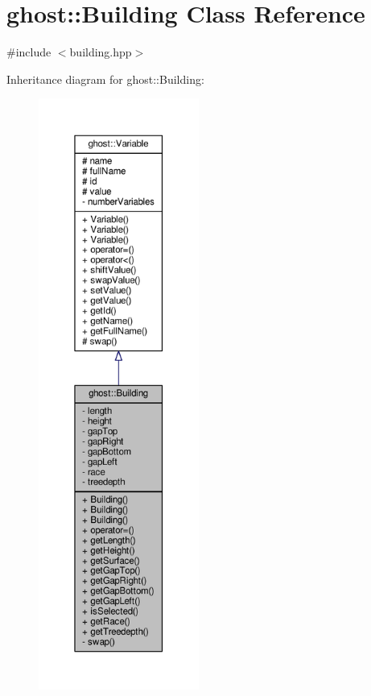 \hypertarget{classghost_1_1Building}{\section{ghost\-:\-:Building Class Reference}
\label{classghost_1_1Building}
}


{\ttfamily \#include $<$building.\-hpp$>$}



Inheritance diagram for ghost\-:\-:Building\-:\nopagebreak
\begin{figure}[H]
\begin{center}
\leavevmode
\includegraphics[height=550pt]{classghost_1_1Building__inherit__graph}
\end{center}
\end{figure}


